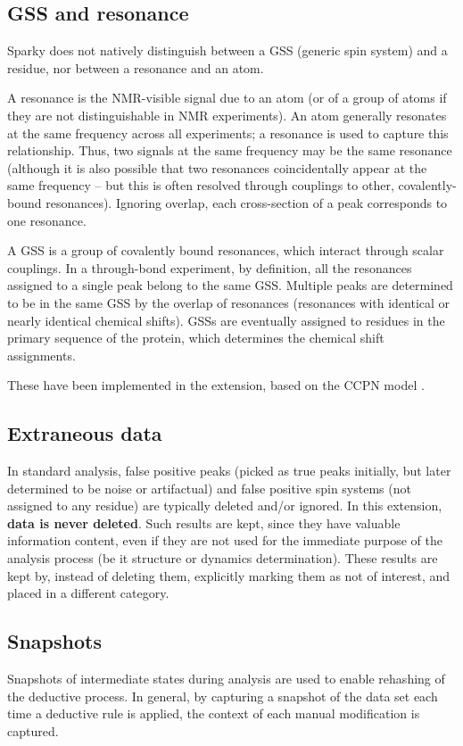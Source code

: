 \documentclass[11pt,a4paper]{article}
\begin{document}
\subsection{GSS and resonance}
Sparky does not natively distinguish between a GSS (generic spin system) and
a residue, nor between a resonance and an atom.

A resonance is the NMR-visible signal due to an atom (or of a group of
atoms if they are not distinguishable in NMR experiments).  An atom generally
resonates at the same frequency across all experiments; a resonance is used
to capture this relationship.  Thus, two signals at the same frequency
may be the same resonance (although it is also possible that two resonances
coincidentally appear at the same frequency -- but this is often resolved
through couplings to other, covalently-bound resonances).  Ignoring overlap,
each cross-section of a peak corresponds to one resonance.

A GSS is a group of covalently bound resonances, which interact through 
scalar couplings.  In a through-bond experiment, by definition, all the
resonances assigned to a single peak belong to the same GSS.  Multiple peaks
are determined to be in the same GSS by the overlap of resonances (resonances
with identical or nearly identical chemical shifts).  GSSs are eventually
assigned to residues in the primary sequence of the protein, which determines
the chemical shift assignments.

These have been implemented in the extension, based on the CCPN model \cite{ccpn}.

\subsection{Extraneous data}
In standard analysis, false positive peaks (picked as true peaks initially,
but later determined to be noise or artifactual) and false positive spin 
systems (not assigned to any residue) are typically deleted and/or ignored.
In this extension, \textbf{data is never deleted}.  Such results are kept,
since they have valuable information content, even if they are not used for
the immediate purpose of the analysis process (be it structure or dynamics
determination).  These results are kept by, instead of deleting them, 
explicitly marking them as not of interest, and placed in a different
category.

\subsection{Snapshots}
Snapshots of intermediate states during analysis are used to enable rehashing
of the deductive process.  In general, by capturing a snapshot of the data set
each time a deductive rule is applied, the context of each manual modification
is captured.
\end{document}
